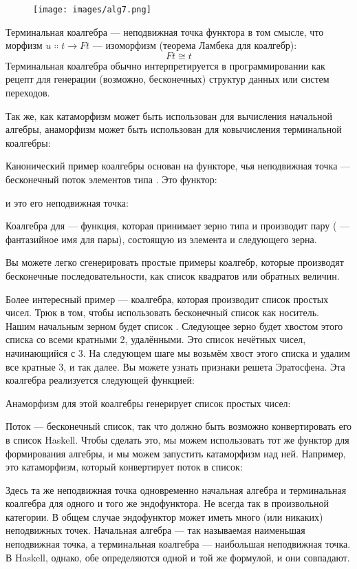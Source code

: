 \begin{figure}[H]
  \centering
  \texttt{[image: images/alg7.png]}
\end{figure}

\noindent
Терминальная коалгебра --- неподвижная точка функтора в том смысле, что
морфизм $u \Colon t \to F t$ --- изоморфизм
(теорема Ламбека для коалгебр):
\[F t \cong t\]
Терминальная коалгебра обычно интерпретируется в программировании как рецепт
для генерации (возможно, бесконечных) структур данных или систем
переходов.

Так же, как катаморфизм может быть использован для вычисления начальной алгебры,
анаморфизм может быть использован для ковычисления терминальной коалгебры:

Канонический пример коалгебры основан на функторе, чья неподвижная
точка --- бесконечный поток элементов типа . Это
функтор:

и это его неподвижная точка:

Коалгебра для  --- функция, которая принимает зерно
типа  и производит пару ( --- фантазийное имя
для пары), состоящую из элемента и следующего зерна.

Вы можете легко сгенерировать простые примеры коалгебр, которые производят
бесконечные последовательности, как список квадратов или обратных величин.

Более интересный пример --- коалгебра, которая производит список
простых чисел. Трюк в том, чтобы использовать бесконечный список как носитель. Нашим начальным
зерном будет список \code{{[}2..{]}}. Следующее зерно будет хвостом
этого списка со всеми кратными 2, удалёнными. Это список нечётных чисел,
начинающийся с 3. На следующем шаге мы возьмём хвост этого списка и
удалим все кратные 3, и так далее. Вы можете узнать признаки
решета Эратосфена. Эта коалгебра реализуется следующей
функцией:

Анаморфизм для этой коалгебры генерирует список простых чисел:

Поток --- бесконечный список, так что должно быть возможно конвертировать его в
список Haskell. Чтобы сделать это, мы можем использовать тот же функтор 
для формирования алгебры, и мы можем запустить катаморфизм над ней. Например,
это катаморфизм, который конвертирует поток в список:

Здесь та же неподвижная точка одновременно начальная алгебра и
терминальная коалгебра для одного и того же эндофунктора. Не всегда так
в произвольной категории. В общем случае эндофунктор может иметь много (или
никаких) неподвижных точек. Начальная алгебра --- так называемая наименьшая неподвижная
точка, а терминальная коалгебра --- наибольшая неподвижная точка. В
Haskell, однако, обе определяются одной и той же формулой, и они
совпадают.

